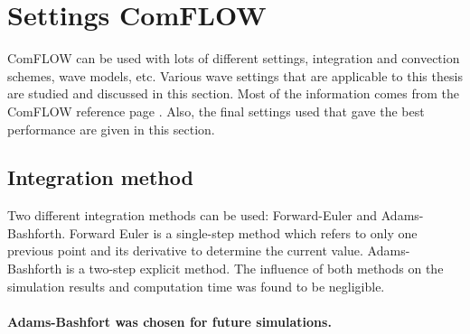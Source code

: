 

\section{Settings ComFLOW}
\label{sec: possible settings ComFLOW}
ComFLOW can be used with lots of different settings, integration and convection schemes, wave models, etc. Various wave settings that are applicable to this thesis are studied and discussed in this section. Most of the information comes from the ComFLOW reference page \parencite{poseidon_comflow_reference_page}. Also, the final settings used that gave the best performance are given in this section.

\subsection{Integration method}

Two different integration methods can be used: Forward-Euler and Adams-Bashforth. Forward Euler is a single-step method which refers to only one previous point and its derivative to determine the current value. Adams-Bashforth is a two-step explicit method. The influence of both methods on the simulation results and computation time was found to be negligible.\\
\\
\textbf{Adams-Bashfort was chosen for future simulations.}

